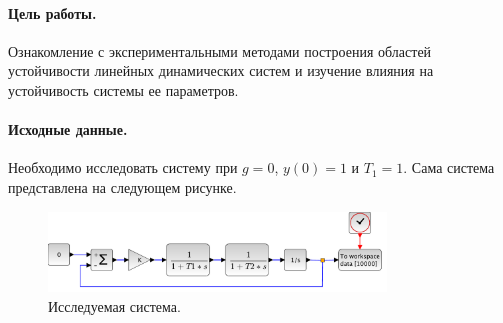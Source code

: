 \documentclass[a4paper, 11pt]{article}
\begin{document}
\paragraph{Цель работы.}Ознакомление с экспериментальными методами построения областей устойчивости линейных динамических систем и изучение влияния на устойчивость системы ее параметров.

\paragraph{Исходные данные.} Необходимо исследовать систему при $g = 0$, $y(0) = 1$ и $T_1 = 1$. Сама система представлена на следующем рисунке.
\begin{figure}[h!]
    \centering
    \includegraphics[width = 0.8\textwidth]{images/model.pdf}
    \caption{Исследуемая система.}
\end{figure}
\end{document}
